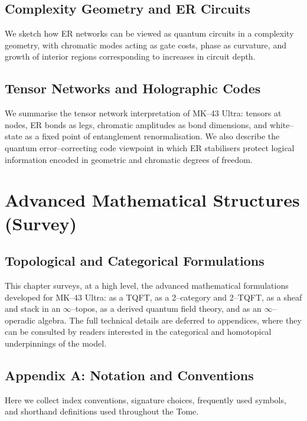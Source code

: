 \documentclass[11pt]{book}
\begin{document}
\chapter{Complexity Geometry and ER Circuits}

We sketch how ER networks can be viewed as quantum circuits in a complexity geometry, with chromatic modes acting as gate costs, phase as curvature, and growth of interior regions corresponding to increases in circuit depth.

\chapter{Tensor Networks and Holographic Codes}

We summarise the tensor network interpretation of MK--43 Ultra:
tensors at nodes, ER bonds as legs, chromatic amplitudes as bond dimensions, and white--state as a fixed point of entanglement renormalisation.
We also describe the quantum error--correcting code viewpoint in which ER stabilisers protect logical information encoded in geometric and chromatic degrees of freedom.

\part{Advanced Mathematical Structures (Survey)}

\chapter{Topological and Categorical Formulations}

This chapter surveys, at a high level, the advanced mathematical formulations developed for MK--43 Ultra:
as a TQFT, as a 2--category and 2--TQFT, as a sheaf and stack in an $\infty$--topos, as a derived quantum field theory, and as an $\infty$--operadic algebra.
The full technical details are deferred to appendices, where they can be consulted by readers interested in the categorical and homotopical underpinnings of the model.

\appendix

\chapter{Appendix A: Notation and Conventions}

Here we collect index conventions, signature choices, frequently used symbols, and shorthand definitions used throughout the Tome.
\end{document}
